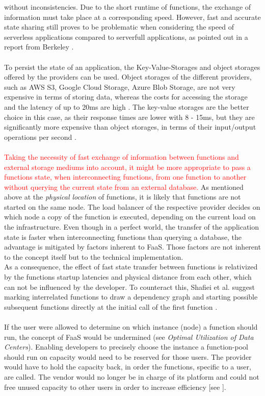 \documentclass[a4paper,twoside,11pt, pagesize]{scrartcl}
\begin{document}
\begin{spacing}{1.2}
without inconsistencies. Due to the short runtime of functions, the exchange of information must take place at a corresponding speed. However, fast and accurate state sharing still proves to be problematic when considering the speed of serverless applications compared to serverfull applications, as pointed out in a report from Berkeley \cite{jonas2019cloud}.\\\\ To persist the state of an application, the Key-Value-Storages and object storages offered by the providers can be used. Object storages of the different providers, such as AWS S3, Google Cloud Storage, Azure Blob Storage, are not very expensive in terms of storing data, whereas the costs for accessing the storage and the latency of up to 20ms are high \cite{jonas2019cloud}. The key-value storages are the better choice in this case, as their response times are lower with 8 - 15ms, but they are significantly more expensive than object storages, in terms of their input/output operations per second \cite{jonas2019cloud}.\\\\ \textcolor{red}{Taking the necessity of fast exchange of information between functions and external storage mediums into account, it might be more appropriate to pass a functions state, when interconnecting functions, from one function to another without querying the current state from an external database.} As mentioned above at the \textit{physical location} of functions, it is likely that functions are not started on the same node. The load balancer of the respective provider decides on which node a copy of the function is executed, depending on the current load on the infrastructure. Even though in a perfect world, the transfer of the application state is faster when interconnecting functions than querying a database, the advantage is mitigated by factors inherent to FaaS. Those factors are not inherent to the concept itself but to the technical implementation.\\ As a consequence, the effect of fast state transfer between functions is relativized by the functions startup latencies and physical distance from each other, which can not be influenced by the developer. To counteract this, Shaﬁei et al. suggest marking interrelated functions to draw a dependency graph and starting possible subsequent functions directly at the initial call of the first function \cite{shafiei2020serverless}.\\\\ If the user were allowed to determine on which instance (node) a function should run, the concept of FaaS would be undermined (see \textit{Optimal Utilization of Data Centers}). Enabling developers to precisely choose the instance a function-pool should run on capacity would need to be reserved for those users. The provider would have to hold the capacity back, in order the functions, specific to a user, are called. The vendor would no longer be in charge of its platform and could not free unused capacity to other users in order to increase efficiency [see \cite{fowler2018serverless}]. 

\end{spacing}
\end{document}
